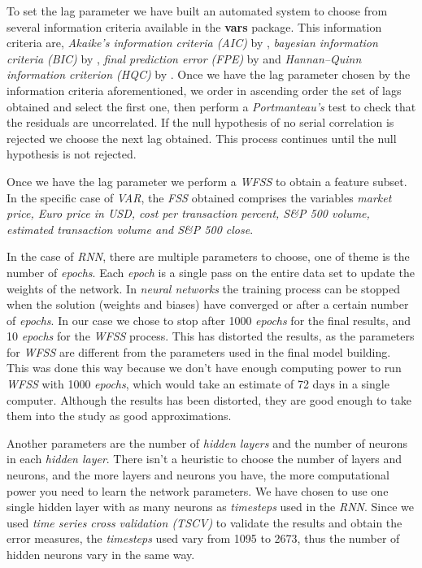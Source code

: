 To set the lag parameter we have built an automated system to choose
from several information criteria available in the \textbf{vars}
package. This information criteria are, \textit{Akaike's information
criteria (AIC)} by \cite{akaike1974new}, \textit{bayesian information
criteria (BIC)} by \cite{schwarz1978estimating}, \textit{final
prediction error (FPE)} by \cite{akaike1973infor} and
\textit{Hannan–Quinn information criterion (HQC)} by
\cite{hannan1979determination}. Once we have the lag parameter chosen
by the information criteria aforementioned, we order in ascending
order the set of lags obtained and select the first one, then perform
a \textit{Portmanteau's} test to check that the residuals are
uncorrelated. If the null hypothesis of no serial correlation is
rejected we choose the next lag obtained. This process continues until
the null hypothesis is not rejected.

Once we have the lag parameter we perform a \textit{WFSS} to obtain a
feature subset. In the specific case of \textit{VAR}, the \textit{FSS}
obtained comprises the variables \textit{market price, Euro price in
  USD, cost per transaction percent, S\&P 500 volume, estimated
  transaction volume and S\&P 500 close}.

In the case of \textit{RNN}, there are multiple parameters to choose,
one of theme is the number of \textit{epochs}. Each \textit{epoch} is
a single pass on the entire data set to update the weights of the
network. In \textit{neural networks} the training process can be
stopped when the solution (weights and biases) have converged or after
a certain number of \textit{epochs}. In our case we chose to stop
after 1000 \textit{epochs} for the final results, and 10
\textit{epochs} for the \textit{WFSS} process. This has distorted the
results, as the parameters for \textit{WFSS} are different from the
parameters used in the final model building. This was done this way
because we don't have enough computing power to run \textit{WFSS} with
1000 \textit{epochs}, which would take an estimate of 72 days in a
single computer. Although the results has been distorted, they are
good enough to take them into the study as good approximations.

Another parameters are the number of \textit{hidden layers} and the
number of neurons in each \textit{hidden layer}. There isn't a
heuristic to choose the number of layers and neurons, and the more
layers and neurons you have, the more computational power you need to
learn the network parameters. We have chosen to use one single hidden
layer with as many neurons as \textit{timesteps} used in the
\textit{RNN}. Since we used \textit{time series cross validation
  (TSCV)} to validate the results and obtain the error measures, the
\textit{timesteps} used vary from 1095 to 2673, thus the number of
hidden neurons vary in the same way.

